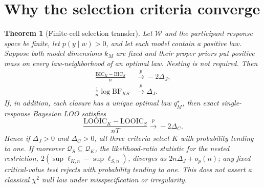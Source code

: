 \documentclass[11pt,letterpaper]{article}
\theoremstyle{plain}
\newtheorem{theorem}{Theorem}[section]
\theoremstyle{definition}
\begin{document}
\section{Why the selection criteria converge}
\begin{theorem}[Finite-cell selection transfer]\label{thm:transfer}
Let $\mathcal W$ and the participant response space be finite, let $p(y\mid w)>0$, and let each model contain a positive law. Suppose both model dimensions $k_M$ are fixed and their proper priors put positive mass on every law-neighborhood of an optimal law. Nesting is not required. Then
\begin{align}\label{eq:transfer}
\frac{\mathrm{BIC}_K-\mathrm{BIC}_S}{n}&\xrightarrow{p}-2\Delta_J,\\
\frac1n\log\mathrm{BF}_{KS}&\xrightarrow{p}\Delta_J.
\end{align}
If, in addition, each closure has a unique optimal law $q_M^\star$, then exact single-response Bayesian LOO satisfies
\begin{equation}\label{eq:loo}
\frac{\mathrm{LOOIC}_K-\mathrm{LOOIC}_S}{nT}\xrightarrow{p}-2\Delta_C.
\end{equation}
Hence if $\Delta_J>0$ and $\Delta_C>0$, all three criteria select $K$ with probability tending to one. If moreover $\mathcal Q_S\subseteq\mathcal Q_K$, the likelihood-ratio statistic for the nested restriction, $2(\sup\ell_{K,n}-\sup\ell_{S,n})$, diverges as $2n\Delta_J+o_p(n)$; any fixed critical-value test rejects with probability tending to one. This does \emph{not} assert a classical $\chi^2$ null law under misspecification or irregularity.
\end{theorem}
\end{document}
